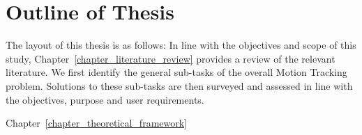 \section{Outline of Thesis}
The layout of this thesis is as follows: In line with the objectives and scope
of this study, Chapter~\ref{chapter_literature_review} provides a review of the
relevant literature. We first identify the general sub-tasks of the overall
Motion Tracking problem. Solutions to these sub-tasks are then surveyed and
assessed in line with the objectives, purpose and user requirements. 

Chapter~\ref{chapter_theoretical_framework}  



